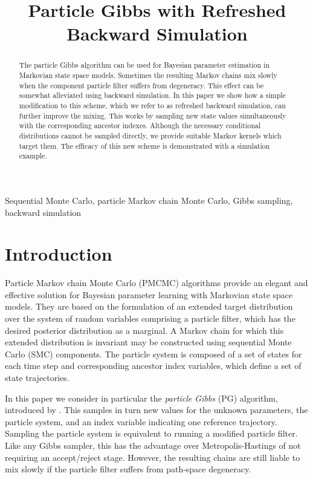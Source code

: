 \documentclass{article}
\title{Particle Gibbs with Refreshed Backward Simulation}
\begin{document}
\ninept
\maketitle

\begin{abstract}
 The particle Gibbs algorithm can be used for Bayesian parameter estimation in Markovian state space models. Sometimes the resulting Markov chains mix slowly when the component particle filter suffers from degeneracy. This effect can be somewhat alleviated using backward simulation. In this paper we show how a simple modification to this scheme, which we refer to as refreshed backward simulation, can further improve the mixing. This works by sampling new state values simultaneously with the corresponding ancestor indexes. Although the necessary conditional distributions cannot be sampled directly, we provide suitable Markov kernels which target them. The efficacy of this new scheme is demonstrated with a simulation example.
\end{abstract}
%
\begin{keywords}
Sequential Monte Carlo, particle Markov chain Monte Carlo, Gibbs sampling, backward simulation
\end{keywords}


\section{Introduction}
Particle Markov chain Monte Carlo (PMCMC) algorithms \cite{Andrieu2010,Olsson2011,Chopin2013,Lindsten2014} provide an elegant and effective solution for Bayesian parameter learning with Markovian state space models. They are based on the formulation of an extended target distribution over the system of random variables comprising a particle filter, which has the desired posterior distribution as a marginal. A Markov chain for which this extended distribution is invariant may be constructed using sequential Monte Carlo (SMC) components. The particle system is composed of a set of states for each time step and corresponding ancestor index variables, which define a set of state trajectories.

In this paper we consider in particular the \emph{particle Gibbs} (PG) algorithm, introduced by \cite{Andrieu2010}. This samples in turn new values for the unknown parameters, the particle system, and an index variable indicating one reference trajectory. Sampling the particle system is equivalent to running a modified particle filter. Like any Gibbs sampler, this has the advantage over Metropolis-Hastings of not requiring an accept/reject stage. However, the resulting chains are still liable to mix slowly if the particle filter suffers from path-space degeneracy.
\end{document}
